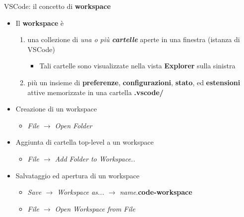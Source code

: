 \documentclass[xcolor=dvipsnames,presentation]{beamer}
\begin{document}
\begin{frame}{VSCode: il concetto di \textbf{workspace}}

\begin{itemize}
\item Il \textbf{workspace} è
	\begin{enumerate}
	\item una collezione di \emph{una o più \textbf{cartelle}} aperte in una finestra (istanza di VSCode)
	\begin{itemize}
	\item Tali cartelle sono visualizzate nella vista \textbf{Explorer} sulla sinistra
	\end{itemize}
	\item più un insieme di \textbf{preferenze}, \textbf{configurazioni}, \textbf{stato}, ed \textbf{estensioni} attive memorizzate in una cartella \textbf{.vscode/}
	\end{enumerate}
\item Creazione di un workspace
	\begin{itemize}
	\item \emph{File $\to$ Open Folder}
	\end{itemize}
\item Aggiunta di cartella top-level a un workspace
	\begin{itemize}
	\item \emph{File $\to$ Add Folder to Workspace..}
	\end{itemize}
\item Salvataggio ed apertura di un workspace
	\begin{itemize}
	\item \emph{Save $\to$ Workspace as... $\to$} \emph{name}.\textbf{code-workspace}
	\item \emph{File $\to$ Open Workspace from File}
	\end{itemize}
\end{itemize}

\end{frame}
\end{document}
